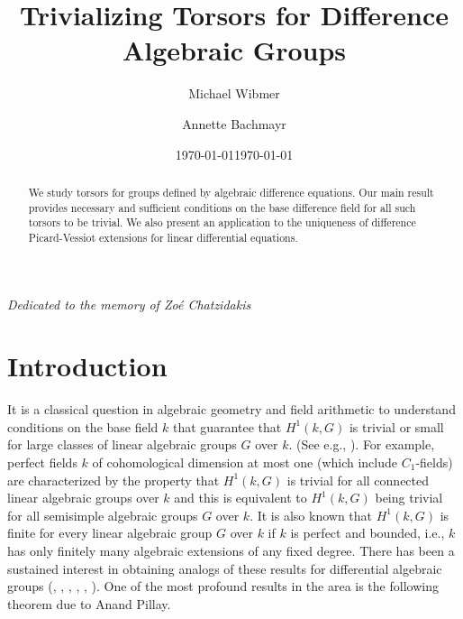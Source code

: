\documentclass[oneside,reqno]{amsart}
\title{Trivializing Torsors for Difference Algebraic Groups}
\date{\today}
\author{Michael Wibmer}
\author{Annette Bachmayr}
\date{\today}
\theoremstyle{definition}
\newcommand{\ab}[1]{\todo[inline,color=blue!20!white]{\textbf{Annette:} #1}}
\begin{document}
\maketitle


\begin{center} \emph{Dedicated to the memory of Zo\'{e} Chatzidakis} \end{center}

\medskip

\begin{abstract}
We study torsors for groups defined by algebraic difference equations.
Our main result provides necessary and sufficient conditions on the base difference field for all such torsors to be trivial. %
We also present an application to the uniqueness of difference Picard-Vessiot extensions for linear differential equations.
\end{abstract}



\section{Introduction}

It is a classical question in algebraic geometry and field arithmetic to understand conditions on the base field $k$  that guarantee that $H^1(k,G)$ is trivial or small for large classes of linear algebraic groups $G$ over $k$. (See e.g., \cite{Serre:GaloisCohomology}). For example, perfect fields $k$ of cohomological dimension at most one (which include  $C_1$-fields) are characterized by the property that $H^1(k,G)$ is trivial for all connected linear algebraic groups over $k$ and this is equivalent to $H^1(k,G)$ being trivial for all semisimple algebraic groups $G$ over $k$. It is also known that $H^1(k,G)$ is finite for every linear algebraic group $G$ over $k$ if $k$ is perfect and bounded, i.e., $k$ has only finitely many algebraic extensions of any fixed degree. There has been a sustained interest in obtaining analogs of these results for differential algebraic groups (\cite{Pillay:ThePicardVessiotTheoryConstrainedCohomology}, \cite{MinchenkoOvchinnikov:TrivialityOfDifferentialGaloisCohomologyOfLinearDifferentialAlgebraicGroups}, \cite{ChatzidakisPillay:GeneralizedPVExtensionsAndDifferentialGaloisCohomology},
\cite{LeonSanchezPillay:DifferentialGaloisCohomologyAndParameterizedPicardVessiotExtensions}, \cite{LeonSanchezMeretzkyPillay:MoreOnGaloisCohomologyDefinabilityAndDifferentialAlgebraicGroups},  \cite{MeretzkyPillay:PicardVessiotExtensionsLinearDifferentialAlgebraicGroupsAndTheirTorsors}). One of the most profound results in the area is the following theorem due to Anand Pillay.
\end{document}
